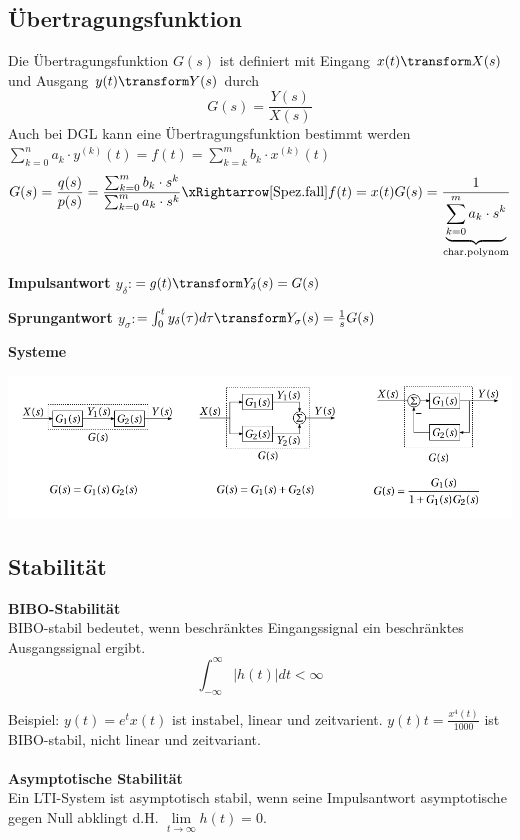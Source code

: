 \subsection{Übertragungsfunktion}\label{ü-funktion}
Die Übertragungsfunktion $G(s)$ ist definiert mit Eingang $x(t) \transform X(s)$ und Ausgang $y(t) \transform Y(s)$ durch 
\[G(s) = \frac{Y(s)}{X(s)}\]
Auch bei DGL kann eine Übertragungsfunktion bestimmt werden $\sum_{k=0}^{n}a_k\cdot y^{(k)}(t) = f(t) = \sum_{k=k}^{m}b_k\cdot x^{(k)}(t)$
\[
	G(s) = \frac{q(s)}{p(s)} = \frac{\sum_{k=0}^{m}b_k\cdot s^k}{\sum_{k=0}^{m}a_k\cdot s^k} \xRightarrow[\text{Spez.fall}]{f(t) = x(t)} G(s)=  \frac{1}{\underbrace{\sum_{k=0}^{m}a_k\cdot s^k}_\text{char.polynom}}
\]

\noindent\textbf{Impulsantwort $y_{\delta}$}:$=  g(t) \transform Y_\delta(s) = G(s)$

\noindent\textbf{Sprungantwort $y_{\sigma}$}:$= \int_{0}^{t}y_\delta(\tau)d\tau \transform Y_\sigma(s) = \frac{1}{s}G(s)$

\noindent\textbf{Systeme}\\
\begin{center}
	\includegraphics[width=\columnwidth]{Images/systeme}
\end{center}


\subsection{Stabilität}
\textbf{BIBO-Stabilität}\\
BIBO-stabil bedeutet, wenn beschränktes Eingangssignal ein beschränktes Ausgangssignal ergibt.
\[
\int_{-\infty}^{\infty}\left|h(t)\right|dt < \infty
\]

Beispiel: $y(t) = e^tx(t)$ ist instabel, linear und zeitvarient. $y(t)t = \frac{x^4(t)}{1000}$ ist BIBO-stabil, nicht linear und zeitvariant.
\\ ~\\
\textbf{Asymptotische Stabilität}\\
Ein LTI-System ist asymptotisch stabil, wenn seine Impulsantwort asymptotische gegen Null abklingt d.H. $\lim\limits_{t\rightarrow\infty}h(t) = 0$.

